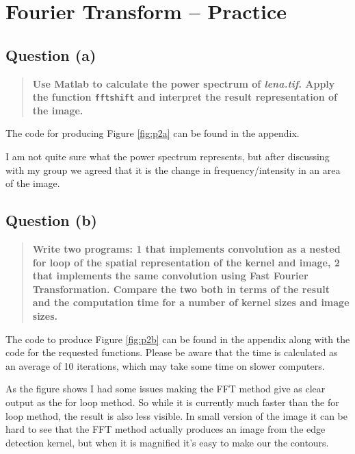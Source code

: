 \section{Fourier Transform – Practice}
\subsection{Question (a)}
\begin{quote}
  \textbf{Use Matlab to calculate the power spectrum of \textit{lena.tif}. Apply
    the function \texttt{fftshift} and interpret the result representation of
    the image.}
\end{quote}


The code for producing Figure \ref{fig:p2a} can be found in the appendix.

I am not quite sure what the power spectrum represents, but after discussing with my group we agreed
that it is the change in frequency/intensity in an area of the image.

\subsection{Question (b)}
\begin{quote}
  \textbf{Write two programs: 1 that implements convolution as a nested for loop
    of the spatial representation of the kernel and image, 2 that implements
    the same convolution using Fast Fourier Transformation. Compare the two both
    in terms of the result and the computation time for a number of kernel sizes
    and image sizes.}
\end{quote}

The code to produce Figure \ref{fig:p2b} can be found in the appendix along with
the code for the requested functions. Please be aware that the time is
calculated as an average of 10 iterations, which may take some time on slower
computers.


As the figure shows I had some issues making the FFT method give as clear output
as the for loop method. So while it is currently much faster than the for loop
method, the result is also less visible.  In small version of the image it can
be hard to see that the FFT method actually produces an image from the edge
detection kernel, but when it is magnified it's easy to make our the contours.

